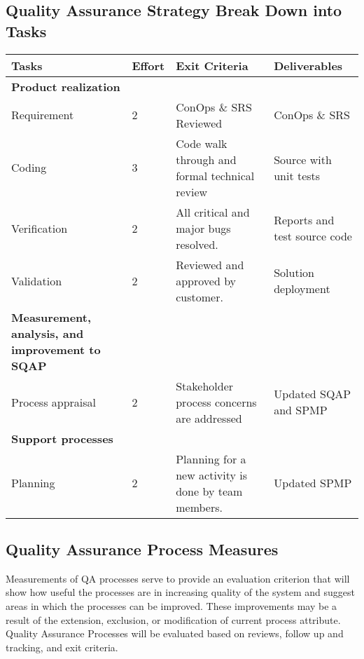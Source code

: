 \documentclass[a3paper, 11pt]{article}
\begin{document}
\subsection{Quality Assurance Strategy Break Down into Tasks}
\begin{center}
	\begin{tabular}{|p{4cm}|p{1.4cm}|p{5cm}|p{5cm}|}
		\hline
		\textbf{Tasks} & \textbf{Effort} & \textbf{Exit Criteria} & \textbf{Deliverables} \\ \hline
		\textbf{Product realization} & & & \\ \hline
		Requirement & 2 & ConOps \& SRS Reviewed & ConOps \& SRS \\ \hline
		Coding & 3 & Code walk through and formal technical review & Source with unit tests \\ \hline
		Verification & 2 & All critical and major bugs resolved. & Reports and test source code \\ \hline
		Validation & 2 & Reviewed and approved by customer. & Solution deployment \\ \hline
		\textbf{Measurement, analysis, and improvement to SQAP} & & & \\ \hline
		Process appraisal & 2 & Stakeholder process concerns are addressed & Updated SQAP and SPMP \\ \hline
		\textbf{Support processes} & & & \\ \hline
		Planning & 2 & Planning for a new activity is done by team members. & Updated SPMP \\ \hline
	\end{tabular}
\end{center}

\subsection{Quality Assurance Process Measures}
Measurements of QA processes serve to provide an evaluation criterion that will show how useful the processes are in increasing quality of the system and suggest areas in which the processes can be improved. These improvements may be a result of the extension, exclusion, or modification of current process attribute. \\
Quality Assurance Processes will be evaluated based on reviews, follow up and tracking, and exit criteria. 
\end{document}

